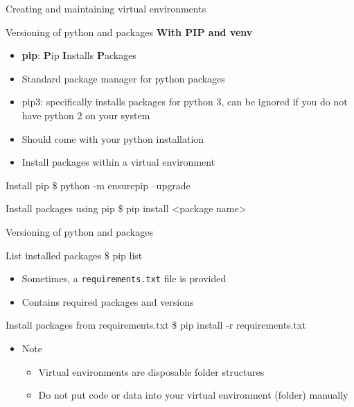 \documentclass[10pt, aspectratio=169]{beamer}
\newcommand{\gemph}[1]{\textcolor{mzesgold}{#1}}
\begin{document}
{\begin{frame}{Creating and maintaining virtual environments}
  \end{frame}

  	\begin{frame}{Versioning of python and packages}
	\small
\textbf{With \gemph{PIP} and \gemph{venv}}
                \begin{itemize}
                    \item \textbf{pip}: \textbf{P}ip \textbf{I}nstalls \textbf{P}ackages
                    \item Standard package manager for python packages
                    \item pip3: specifically installs packages for python 3, can be ignored if you do not have python 2 on your system
                    \item Should come with your python installation
                    \item Install packages within a virtual environment
                \end{itemize}
                \begin{block}{Install \gemph{pip}}
                   \$ python -m ensurepip --upgrade
		          \end{block} 
                \begin{block}{Install packages using \gemph{pip}}
                   \$ pip install <package name>
		          \end{block} 
  \end{frame}

  	\begin{frame}{Versioning of python and packages}
	\small
                 \begin{block}{List installed packages}
                   \$ pip list
		          \end{block} 
                \begin{itemize}
                    \item Sometimes, a \texttt{requirements.txt} file is provided
                    \item Contains required packages and versions
                \end{itemize}
                \begin{block}{Install packages from \gemph{requirements.txt}}
                   \$ pip install -r requirements.txt
		          \end{block} 
            \begin{itemize}
                \item Note
                \begin{itemize}
                    \item Virtual environments are disposable folder structures
                \item Do not put code or data into your virtual environment (folder) manually
                \end{itemize}
            \end{itemize}
  \end{frame}



}
\end{document}
